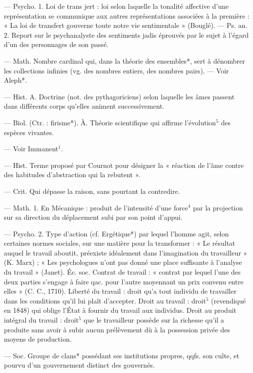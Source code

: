 \begin{itemize}[leftmargin=1cm, label=, itemsep=1pt]
 — Psycho. 1. Loi de trans
jert : loi selon laquelle la tonalité
affective d’une représentation se
communique aux autres représentations associées à la première : « La loi
de transfert gouverne toute notre
vie sentimentale » (Bouglé). —
Ps. an. 2. Report sur le psychanalyste des sentiments jadis éprouvés
par le sujet à l'égard d’un des personnages de son passé.

 — Math. Nombre
cardinal qui, dans la théorie des
ensembles*, sert à dénombrer les
collections infinies (vg. des nombres
entiers, des nombres pairs). — Voir
Aleph*.

 — Hist.
A. Doctrine (not. des pythagoriciens) selon laquelle les âmes passent dans différents corps qu’elles
animent successivement.

 — Biol. (Ctr. : firisme*).
À. Théorie scientifique qui
affirme l’évolution$^5$ des espèces
vivantes.

 — Voir Immanent$^1$.

 — Hist. Terme
proposé par Cournot pour désigner
la « réaction de l’âme contre des
habitudes d’abstraction qui la rebutent ».

 — Crit. Qui dépasse
la raison, sans pourtant la contredire.

 — Math. 1. En Mécanique :
produit de l'intensité d’une force$^4$
par la projection sur sa direction
du déplacement subi par son point
d'appui.

— Psycho. 2. Type d’action (cf.
Ergétique*) par lequel l'homme agit,
selon certaines normes sociales, sur
une matière pour la transformer :
« Le résultat auquel le travail aboutit, préexiste idéalement dans l’imagination du travailleur » (K. Marx) ;
« Les psychologues n’ont pas donné
une place suffisante à l'analyse du
travail » (Janet). Éc. soc. Contrat de
travail : « contrat par lequel l’une
des deux parties s'engage à faire
qac. pour l’autre moyennant un
prix convenu entre elles » (C. C.,
1710). Liberté du travail : droit qu’a
tout individu de travailler dans les
conditions qu'il lui plaît d'accepter.
Droit au travail : droit$^5$ (revendiqué
en 1848) qui oblige l'État à fournir
du travail aux individus. Droit au
produit intégral du travail : droit$^5$
que le travailleur possède sur la
richesse qu’il a produite sans avoir
à subir aucun prélèvement dû à la
possession privée des moyens de
production.

 — Soc. Groupe de clans* possédant ses institutions propres, qqfs.
son culte, et pourvu d’un gouvernement distinct des gouvernés.


\end{itemize}
